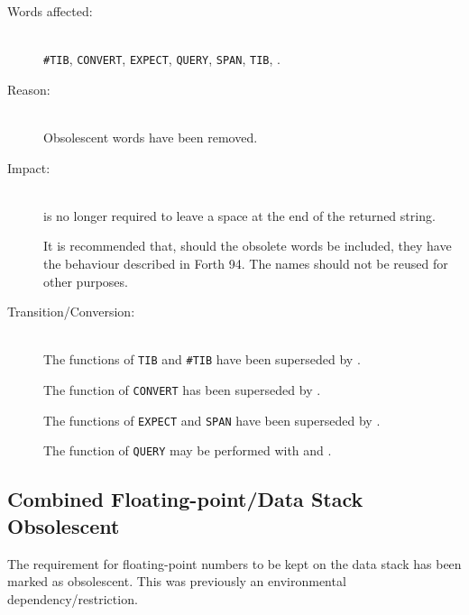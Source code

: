 \begin{description}
\item[Words affected:] ~\\
	\texttt{\#TIB},
  	\texttt{CONVERT},
  	\texttt{EXPECT},
  	\texttt{QUERY},
  	\texttt{SPAN},
  	\texttt{TIB},
  	.
  
\item[Reason:] ~\\
	Obsolescent words have been removed.
  
\item[Impact:] ~\\
	 is no longer required to leave a space at the end of
	the returned string.

	It is recommended that, should the obsolete words be included,
	they have the behaviour described in Forth 94.  The names should
	not be reused for other purposes.

\item[Transition/Conversion:] ~\\
	The functions of \texttt{TIB} and \texttt{\#TIB} have been
	superseded by .
 
	The function of \texttt{CONVERT} has been superseded by
	.

	The functions of \texttt{EXPECT} and \texttt{SPAN} have been
	superseded by .

	The function of \texttt{QUERY} may be performed with 
	and .
\end{description}


\subsection{Combined Floating-point/Data Stack Obsolescent} %
\label{diff:fpstack}

The requirement for floating-point numbers to be kept on the data stack
has been marked as obsolescent.  This was previously an environmental
dependency/restriction.

